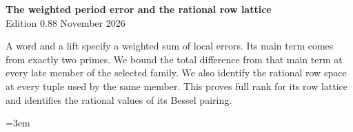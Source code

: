 \begin{center}
{\Large\bfseries The weighted period error and the rational row lattice}\\[4pt]
Edition 0.88  November 2026
\end{center}

A word and a lift specify a weighted sum of local errors. Its main
term comes from exactly two primes. We bound the total difference
from that main term at every late member of the selected family.
We also identify the rational row space at every tuple used by the
same member. This proves full rank for its row lattice and identifies
the rational values of its Bessel pairing.

\begingroup\emergencystretch=3em




\endgroup
